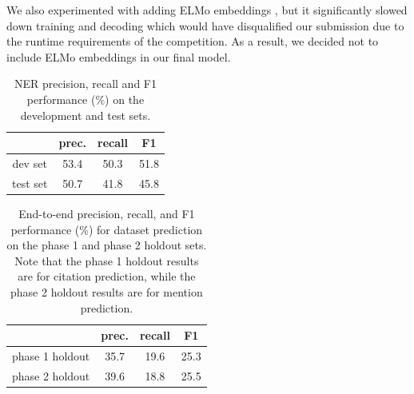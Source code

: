 We also experimented with adding ELMo embeddings \cite{Peters2018DEEPCW}, but it significantly slowed down training and decoding which would have disqualified our submission due to the runtime requirements of the competition. As a result, we decided not to include ELMo embeddings in our final model.

\begin{table}[t]
\centering
\setlength{\tabcolsep}{2pt}
\begin{tabular}{@{}cccc@{}}
\toprule
                  & prec. & recall & F1 \\ \midrule
dev set           & 53.4    & 50.3 & 51.8 \\ 
test set          & 50.7    & 41.8 & 45.8 \\ \bottomrule
\end{tabular}
\caption{NER precision, recall and F1 performance (\%) on the development and test sets.}
\label{tab:ner_results}
\end{table}

\begin{table}[t]
\centering
\setlength{\tabcolsep}{2pt}
\begin{tabular}{@{}cccc@{}}
\toprule
                  & prec. & recall & F1 \\ \midrule
phase 1 holdout   & 35.7  & 19.6 & 25.3 \\ 
phase 2 holdout   & 39.6  & 18.8 & 25.5 \\ \bottomrule
\end{tabular}
\caption{End-to-end precision, recall, and F1 performance (\%) for dataset prediction on the phase 1 and phase 2 holdout sets. Note that the phase 1 holdout results are for citation prediction, while the phase 2 holdout results are for mention prediction.}
\label{tab:test_results}
\end{table}

